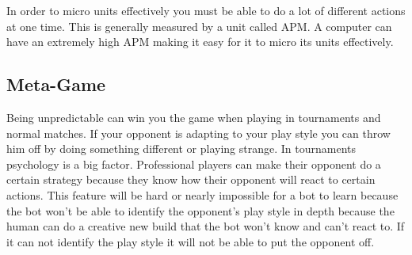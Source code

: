 		In order to micro units effectively you must be able to do a lot of different actions at one time. 
		This is generally measured by a unit called APM. 
		A computer can have an extremely high APM making it easy for it to micro its units effectively.

\subsection{Meta-Game}		
		Being unpredictable can win you the game when playing in tournaments and normal matches. 
		If your opponent is adapting to your play style you can throw him off by doing something different or playing strange.
		In tournaments psychology is a big factor. Professional players can make their opponent do a certain strategy because they know 
		how their opponent will react to certain actions. This feature will be hard or nearly impossible for a bot to learn because the bot won't be able to 
		identify the opponent's play style in depth because the human can do a creative new build that the bot won't know and can't react to. 
		If it can not identify the play style it will not be able to put the opponent off. \\

